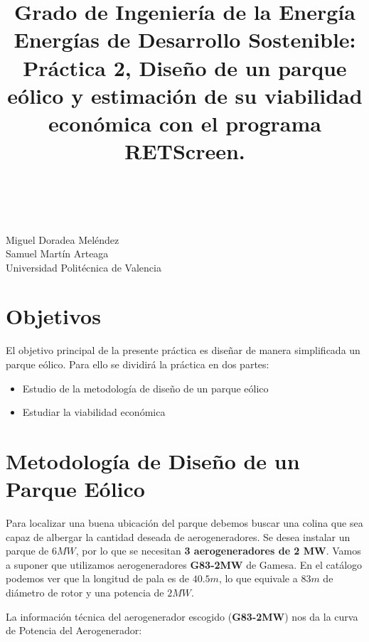 \documentclass[12pt]{article}
\title{{\fontsize{32}{32}\selectfont \bf Grado de Ingeniería de la Energía} \\ \vspace{3mm}
    {\LARGE \color{Blue} \textbf{Energías de Desarrollo Sostenible:} Práctica 2, Diseño de un parque eólico y estimación de su viabilidad económica con el programa RETScreen.}}
\makeatletter
\renewcommand\maketitle{
    {\centering
    \phantom{Hello there} \\
    \vspace{5cm}
    \@title \\
    \large
    \vspace{10mm}
    Miguel Doradea Meléndez \\
    Samuel Martín Arteaga \\
    \vspace{3mm}
    Universidad Politécnica de Valencia
   
    \clearpage}
}
\makeatother
\begin{document}
\maketitle

\section{Objetivos}

El objetivo principal de la presente práctica es diseñar de manera simplificada un parque eólico. Para ello se dividirá la práctica en dos partes:

\begin{itemize}[label = \textbullet]
    \item Estudio de la metodología de diseño de un parque eólico
    \item Estudiar la viabilidad económica
\end{itemize}

\section{Metodología de Diseño de un Parque Eólico}

Para localizar una buena ubicación del parque debemos buscar una colina que sea capaz de albergar la cantidad deseada de aerogeneradores. Se desea instalar un parque de $6 \unit{MW}$, por lo que se necesitan \textbf{3 aerogeneradores de 2 MW}. Vamos a suponer que utilizamos aerogeneradores \textbf{G83-2MW} de Gamesa. En el catálogo podemos ver que la longitud de pala es de $40.5 \unit{m}$, lo que equivale a $83 \unit{m}$ de diámetro de rotor y una potencia de $2 \unit{MW}$. \medskip

La información técnica del aerogenerador escogido (\textbf{G83-2MW}) nos da la curva de Potencia del Aerogenerador:
\end{document}
